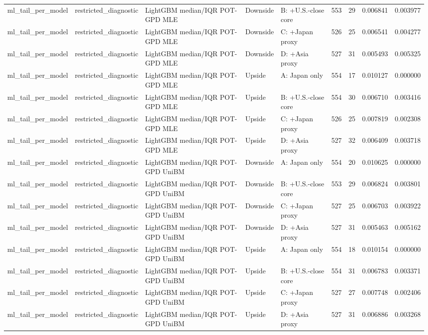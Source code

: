 \begin{tabular}{lllllrrrr}
ml\_tail\_per\_model & restricted\_diagnostic & LightGBM median/IQR POT-GPD MLE & Downside & B: +U.S.-close core & 553 & 29 & 0.006841 & 0.003977 \\
ml\_tail\_per\_model & restricted\_diagnostic & LightGBM median/IQR POT-GPD MLE & Downside & C: +Japan proxy & 526 & 25 & 0.006541 & 0.004277 \\
ml\_tail\_per\_model & restricted\_diagnostic & LightGBM median/IQR POT-GPD MLE & Downside & D: +Asia proxy & 527 & 31 & 0.005493 & 0.005325 \\
ml\_tail\_per\_model & restricted\_diagnostic & LightGBM median/IQR POT-GPD MLE & Upside & A: Japan only & 554 & 17 & 0.010127 & 0.000000 \\
ml\_tail\_per\_model & restricted\_diagnostic & LightGBM median/IQR POT-GPD MLE & Upside & B: +U.S.-close core & 554 & 30 & 0.006710 & 0.003416 \\
ml\_tail\_per\_model & restricted\_diagnostic & LightGBM median/IQR POT-GPD MLE & Upside & C: +Japan proxy & 526 & 25 & 0.007819 & 0.002308 \\
ml\_tail\_per\_model & restricted\_diagnostic & LightGBM median/IQR POT-GPD MLE & Upside & D: +Asia proxy & 527 & 32 & 0.006409 & 0.003718 \\
ml\_tail\_per\_model & restricted\_diagnostic & LightGBM median/IQR POT-GPD UniBM & Downside & A: Japan only & 554 & 20 & 0.010625 & 0.000000 \\
ml\_tail\_per\_model & restricted\_diagnostic & LightGBM median/IQR POT-GPD UniBM & Downside & B: +U.S.-close core & 553 & 29 & 0.006824 & 0.003801 \\
ml\_tail\_per\_model & restricted\_diagnostic & LightGBM median/IQR POT-GPD UniBM & Downside & C: +Japan proxy & 527 & 25 & 0.006703 & 0.003922 \\
ml\_tail\_per\_model & restricted\_diagnostic & LightGBM median/IQR POT-GPD UniBM & Downside & D: +Asia proxy & 527 & 31 & 0.005463 & 0.005162 \\
ml\_tail\_per\_model & restricted\_diagnostic & LightGBM median/IQR POT-GPD UniBM & Upside & A: Japan only & 554 & 18 & 0.010154 & 0.000000 \\
ml\_tail\_per\_model & restricted\_diagnostic & LightGBM median/IQR POT-GPD UniBM & Upside & B: +U.S.-close core & 554 & 31 & 0.006783 & 0.003371 \\
ml\_tail\_per\_model & restricted\_diagnostic & LightGBM median/IQR POT-GPD UniBM & Upside & C: +Japan proxy & 527 & 27 & 0.007748 & 0.002406 \\
ml\_tail\_per\_model & restricted\_diagnostic & LightGBM median/IQR POT-GPD UniBM & Upside & D: +Asia proxy & 527 & 31 & 0.006886 & 0.003268 \\

\end{tabular}
